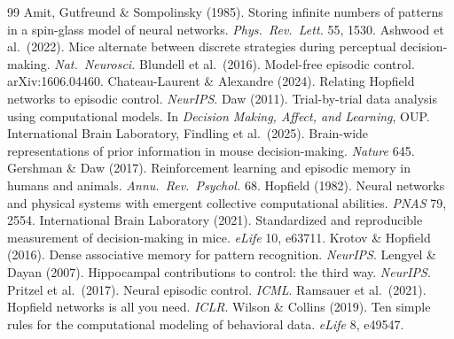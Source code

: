 \documentclass[10pt,a4paper]{article}
\begin{document}
{\footnotesize
\begin{thebibliography}{99}\setlength{\itemsep}{0pt}
 Amit, Gutfreund \& Sompolinsky (1985). Storing infinite numbers of patterns in a spin-glass model of neural networks. \emph{Phys.\ Rev.\ Lett.} 55, 1530.
 Ashwood et al.\ (2022). Mice alternate between discrete strategies during perceptual decision-making. \emph{Nat.\ Neurosci.}
 Blundell et al.\ (2016). Model-free episodic control. arXiv:1606.04460.
 Chateau-Laurent \& Alexandre (2024). Relating Hopfield networks to episodic control. \emph{NeurIPS}.
 Daw (2011). Trial-by-trial data analysis using computational models. In \emph{Decision Making, Affect, and Learning}, OUP.
 International Brain Laboratory, Findling et al.\ (2025). Brain-wide representations of prior information in mouse decision-making. \emph{Nature} 645.
 Gershman \& Daw (2017). Reinforcement learning and episodic memory in humans and animals. \emph{Annu.\ Rev.\ Psychol.} 68.
 Hopfield (1982). Neural networks and physical systems with emergent collective computational abilities. \emph{PNAS} 79, 2554.
 International Brain Laboratory (2021). Standardized and reproducible measurement of decision-making in mice. \emph{eLife} 10, e63711.
 Krotov \& Hopfield (2016). Dense associative memory for pattern recognition. \emph{NeurIPS}.
 Lengyel \& Dayan (2007). Hippocampal contributions to control: the third way. \emph{NeurIPS}.
 Pritzel et al.\ (2017). Neural episodic control. \emph{ICML}.
 Ramsauer et al.\ (2021). Hopfield networks is all you need. \emph{ICLR}.
 Wilson \& Collins (2019). Ten simple rules for the computational modeling of behavioral data. \emph{eLife} 8, e49547.
\end{thebibliography}}
\end{document}
